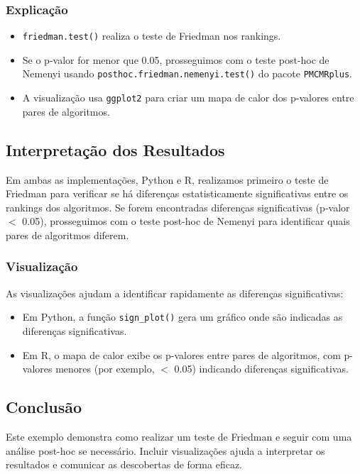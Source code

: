 \documentclass{article}
\begin{document}
\subsubsection*{Explicação}

\begin{itemize}
    \item \texttt{friedman.test()} realiza o teste de Friedman nos rankings.
    \item Se o p-valor for menor que 0.05, prosseguimos com o teste post-hoc de Nemenyi usando \texttt{posthoc.friedman.nemenyi.test()} do pacote \texttt{PMCMRplus}.
    \item A visualização usa \texttt{ggplot2} para criar um mapa de calor dos p-valores entre pares de algoritmos.
\end{itemize}

\subsection*{Interpretação dos Resultados}

Em ambas as implementações, Python e R, realizamos primeiro o teste de Friedman para verificar se há diferenças estatisticamente significativas entre os rankings dos algoritmos. Se forem encontradas diferenças significativas (p-valor $<$ 0.05), prosseguimos com o teste post-hoc de Nemenyi para identificar quais pares de algoritmos diferem.

\subsubsection*{Visualização}

As visualizações ajudam a identificar rapidamente as diferenças significativas:

\begin{itemize}
    \item Em Python, a função \texttt{sign\_plot()} gera um gráfico onde são indicadas as diferenças significativas.
    \item Em R, o mapa de calor exibe os p-valores entre pares de algoritmos, com p-valores menores (por exemplo, $<$ 0.05) indicando diferenças significativas.
\end{itemize}

\subsection*{Conclusão}

Este exemplo demonstra como realizar um teste de Friedman e seguir com uma análise post-hoc se necessário. Incluir visualizações ajuda a interpretar os resultados e comunicar as descobertas de forma eficaz.
\end{document}
